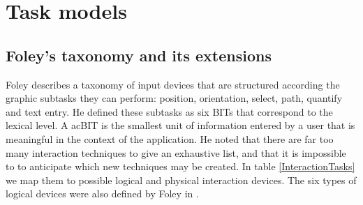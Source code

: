 % 
% 
% 
% 
% 

	
\section{Task models}
\label{interactionTasks}

\subsection{Foley's taxonomy and its extensions}
	
	Foley \cite{Foley1984} describes a taxonomy of input devices that are structured according the graphic subtasks they can perform: position, orientation, select, path, quantify and text entry. He defined these subtasks as six \acp{BIT} that correspond to the lexical level. A ac{BIT} is the smallest unit of information entered by a user that is meaningful in the context of the application. He noted that there are far too many interaction techniques to give an exhaustive list, and that it is impossible to to anticipate which new techniques may be created. In table \ref{InteractionTasks} we map them to possible logical and physical interaction devices. The six types of logical devices were also defined by Foley in \cite{Foley1996}.
	
